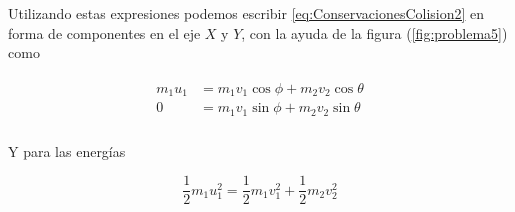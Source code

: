 \documentclass[a4paper,10pt]{article}
\begin{document}
Utilizando estas expresiones podemos escribir \ref{eq:ConservacionesColision2} en forma de componentes
en el eje $X$ y $Y$, con la ayuda de la figura (\ref{fig:problema5}) como

\begin{gather}
 \begin{split}
%
m_1 u_1 &= m_1 v_1 \cos{\phi} + m_2 v_2 \cos{\theta} \\
%
0 &= m_1 v_1 \sin{\phi} + m_2 v_2 \sin{\theta} \\
%
\label{eq:momentaAngulos1}
\end{split}
\end{gather}

Y para las energías

\begin{equation}
 \frac{1}{2}m_1 u_1^2 = \frac{1}{2} m_1 v_1^2 + \frac{1}{2} m_2 v_2^2
 \label{eq:cineticas1}
\end{equation}






\end{document}

